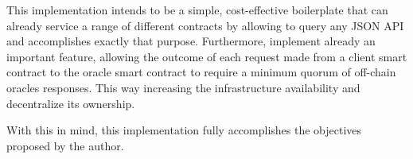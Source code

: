 This implementation intends to be a simple, cost-effective boilerplate that can already service a range of different contracts by allowing to query any JSON API and accomplishes exactly that purpose. Furthermore, implement already an important feature, allowing the outcome of each request made from a client smart contract to the oracle smart contract to require a minimum quorum of off-chain oracles responses. This way increasing the infrastructure availability and decentralize its ownership.

With this in mind, this implementation fully accomplishes the objectives proposed by the author.
